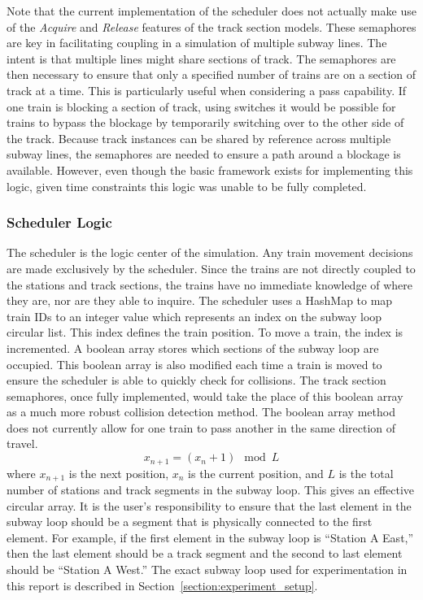 Note that the current implementation of the scheduler does not actually make use of the \textit{Acquire} and \textit{Release} features of the track section models. These semaphores are key in facilitating coupling in a simulation of multiple subway lines.  The intent is that multiple lines might share sections of track.  The semaphores are then necessary to ensure that only a specified number of trains are on a section of track at a time.  This is particularly useful when considering a pass capability.  If one train is blocking a section of track, using switches it would be possible for trains to bypass the blockage by temporarily switching over to the other side of the track. Because track instances can be shared by reference across multiple subway lines, the semaphores are needed to ensure a path around a blockage is available.  However, even though the basic framework exists for implementing this logic, given time constraints this logic was unable to be fully completed.
\subsubsection{Scheduler Logic}
The scheduler is the logic center of the simulation. Any train movement decisions are made exclusively by the scheduler. Since the trains are not directly coupled to the stations and track sections, the trains have no immediate knowledge of where they are, nor are they able to inquire. The scheduler uses a HashMap to map train IDs to an integer value which represents an index on the subway loop circular list.  This index defines the train position.  To move a train, the index is incremented. A boolean array stores which sections of the subway loop are occupied. This boolean array is also modified each time a train is moved to ensure the scheduler is able to quickly check for collisions.  The track section semaphores, once fully implemented, would take the place of this boolean array as a much more robust collision detection method. The boolean array method does not currently allow for one train to pass another in the same direction of travel.
\begin{equation}
x_{n+1} = (x_n+1)\mod L
\end{equation}
where $x_{n+1}$ is the next position, $x_n$ is the current position, and $L$ is the total number of stations and track segments in the subway loop.  This gives an effective circular array. It is the user's responsibility to ensure that the last element in the subway loop should be a segment that is physically connected to the first element.  For example, if the first element in the subway loop is ``Station A East,'' then the last element should be a track segment and the second to last element should be ``Station A West.''  The exact subway loop used for experimentation in this report is described in Section~\ref{section:experiment_setup}.

